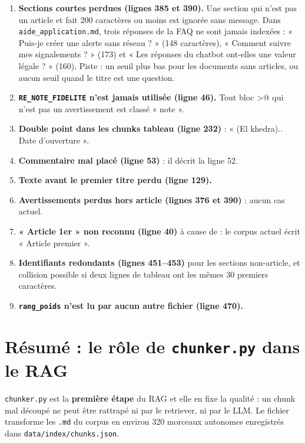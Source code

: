 \documentclass[11pt,a4paper]{article}
\newcommand{\fichier}[1]{\texttt{#1}}
\begin{document}
\begin{enumerate}
  \item \textbf{Sections courtes perdues (lignes 385 et 390).} Une section qui n'est pas un
        article et fait 200 caractères ou moins est ignorée sans message. Dans
        \fichier{aide\_application.md}, trois réponses de la FAQ ne sont jamais indexées :
        « Puis-je créer une alerte sans réseau ? » (148 caractères), « Comment suivre mes
        signalements ? » (173) et « Les réponses du chatbot ont-elles une valeur légale ? »
        (160). Piste : un seuil plus bas pour les documents sans articles, ou aucun seuil
        quand le titre est une question.
  \item \textbf{\texttt{RE\_NOTE\_FIDELITE} n'est jamais utilisée (ligne 46).} Tout bloc
        \Verb@>@ qui n'est pas un avertissement est classé « note ».
  \item \textbf{Double point dans les chunks tableau (ligne 232)} : « (El khedra).. Date
        d'ouverture ».
  \item \textbf{Commentaire mal placé (ligne 53)} : il décrit la ligne 52.
  \item \textbf{Texte avant le premier titre perdu (ligne 129).}
  \item \textbf{Avertissements perdus hors article (lignes 376 et 390)} : aucun cas actuel.
  \item \textbf{« Article 1er » non reconnu (ligne 40)} à cause de \Verb@\b@ : le corpus
        actuel écrit « Article premier ».
  \item \textbf{Identifiants redondants (lignes 451--453)} pour les sections non-article, et
        collision possible si deux lignes de tableau ont les mêmes 30 premiers caractères.
  \item \textbf{\texttt{rang\_poids} n'est lu par aucun autre fichier (ligne 470).}
\end{enumerate}

\section{Résumé : le rôle de \texorpdfstring{\texttt{chunker.py}}{chunker.py} dans le RAG}

\fichier{chunker.py} est la \textbf{première étape} du RAG et elle en fixe la qualité : un
chunk mal découpé ne peut être rattrapé ni par le retriever, ni par le LLM. Le fichier
transforme les \fichier{.md} du corpus en environ 320 morceaux autonomes enregistrés dans
\fichier{data/index/chunks.json}.
\end{document}
